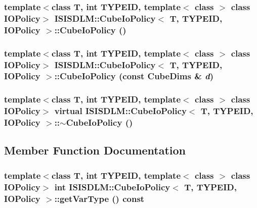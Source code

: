 \subsubsection{\setlength{\rightskip}{0pt plus 5cm}template$<$class T, int TYPEID, template$<$ class $>$ class IOPolicy$>$ {\bf ISISDLM::Cube\-Io\-Policy}$<$ T, TYPEID, IOPolicy $>$::{\bf Cube\-Io\-Policy} ()\hspace{0.3cm}{\tt  [inline]}}\label{classISISDLM_1_1CubeIoPolicy_a0}


\subsubsection{\setlength{\rightskip}{0pt plus 5cm}template$<$class T, int TYPEID, template$<$ class $>$ class IOPolicy$>$ {\bf ISISDLM::Cube\-Io\-Policy}$<$ T, TYPEID, IOPolicy $>$::{\bf Cube\-Io\-Policy} (const {\bf Cube\-Dims} \& {\em d})\hspace{0.3cm}{\tt  [inline]}}\label{classISISDLM_1_1CubeIoPolicy_a1}


\subsubsection{\setlength{\rightskip}{0pt plus 5cm}template$<$class T, int TYPEID, template$<$ class $>$ class IOPolicy$>$ virtual {\bf ISISDLM::Cube\-Io\-Policy}$<$ T, TYPEID, IOPolicy $>$::$\sim${\bf Cube\-Io\-Policy} ()\hspace{0.3cm}{\tt  [inline, virtual]}}\label{classISISDLM_1_1CubeIoPolicy_a2}




\subsection{Member Function Documentation}
\subsubsection{\setlength{\rightskip}{0pt plus 5cm}template$<$class T, int TYPEID, template$<$ class $>$ class IOPolicy$>$ int {\bf ISISDLM::Cube\-Io\-Policy}$<$ T, TYPEID, IOPolicy $>$::get\-Var\-Type () const\hspace{0.3cm}{\tt  [inline]}}\label{classISISDLM_1_1CubeIoPolicy_a3}


